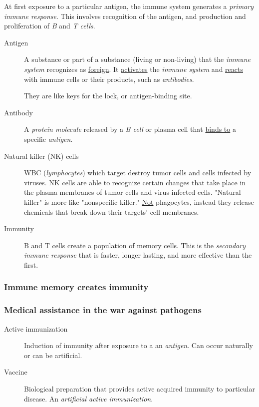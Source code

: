 \documentclass[11pt]{article}
\begin{document}
At first exposure to a particular antigen, the immune system generates a \emph{primary
immune response}. This involves recognition of the antigen, and production and
proliferation of \emph{B} and \emph{T cells}.

\begin{description}
\item[{Antigen}] A substance or part of a substance (living or non-living) that
the \emph{immune system} recognizes as \uline{foreign}. It \uline{activates} the \emph{immune system}
and \uline{reacts} with immune cells or their products, such as \emph{antibodies}. 

They are like keys for the lock, or antigen-binding site.
\item[{Antibody}] A \emph{protein molecule} released by a \emph{B cell} or plasma cell that \uline{binds
to} a specific \emph{antigen}.
\item[{Natural killer (NK) cells}] WBC (\emph{lymphocytes}) which target destroy tumor
cells and cells infected by viruses. NK cells are able to recognize certain
changes that take place in the plasma membranes of tumor cells and
virus-infected cells. "Natural killer" is more like "nonspecific killer."
\uline{Not} phagocytes, instead they release chemicals that break down their
targets' cell membranes.
\item[{Immunity}] B and T cells create a population of memory cells. This is the
\emph{secondary immune response} that is faster, longer lasting, and more
effective than the first.
\end{description}

\subsubsection{Immune memory creates immunity}
\label{sec:orga746543}
\subsubsection{Medical assistance in the war against pathogens}
\label{sec:org0ef081c}

\begin{description}
\item[{Active immunization}] Induction of immunity after exposure to a an \emph{antigen}.
Can occur naturally or can be artificial.
\item[{Vaccine}] Biological preparation that provides active acquired immunity to
particular disease. An \emph{artificial active immunization}.
\end{description}
\end{document}
